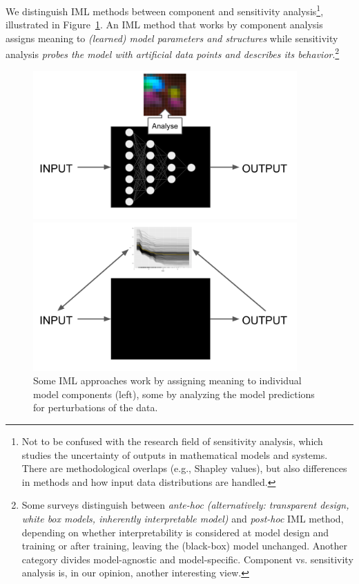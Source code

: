 \documentclass[runningheads]{llncs}
\begin{document}
We distinguish IML methods between component and sensitivity analysis\footnote{Not to be confused with the research field of sensitivity analysis, which studies the uncertainty of outputs in mathematical models and systems. There are methodological overlaps (e.g., Shapley values), but also differences in methods and how input data distributions are handled.}, illustrated in Figure~\ref{fig:iml-type}.
An IML method that works by component analysis assigns meaning to \textit{(learned) model parameters and structures} while sensitivity analysis \textit{probes the model with artificial data points and describes its behavior}.\footnote{Some surveys distinguish between \textit{ante-hoc (alternatively: transparent design, white box models, inherently interpretable model)} and \textit{post-hoc} IML method, depending on whether interpretability is considered at model design and training or after training, leaving the (black-box) model unchanged. Another category divides model-agnostic and model-specific. Component vs. sensitivity analysis is, in our opinion, another interesting view.}

\begin{figure}
    \centering
    \begin{minipage}{0.45\textwidth}
        \centering
        \includegraphics[width=0.9\textwidth]{specific-black-box.png}
    \end{minipage}\hfill
    \begin{minipage}{0.45\textwidth}
        \centering
        \includegraphics[width=0.9\textwidth]{agnostic-black-box.png}
    \end{minipage}
    \label{fig:iml-type}
    \caption{Some IML approaches work by assigning meaning to individual model components (left), some by analyzing the model predictions for perturbations of the data.}
\end{figure}
\end{document}
